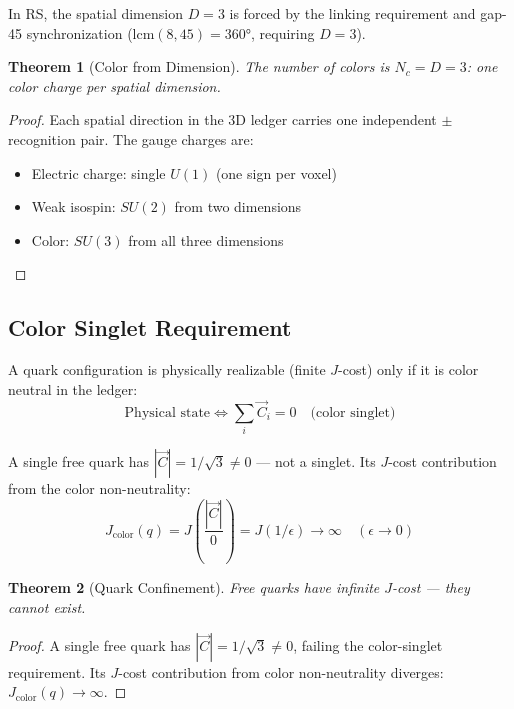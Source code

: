 \documentclass[12pt,a4paper]{article}
\newtheorem{theorem}{Theorem}[section]
\theoremstyle{definition}
\theoremstyle{remark}
\begin{document}
In RS, the spatial dimension $D = 3$ is forced by the linking requirement and 
gap-45 synchronization ($\mathrm{lcm}(8, 45) = 360°$, requiring $D = 3$).

\begin{theorem}[Color from Dimension]
The number of colors is $N_c = D = 3$: one color charge per spatial dimension.
\end{theorem}

\begin{proof}
Each spatial direction in the 3D ledger carries one independent
$\pm$ recognition pair. The gauge charges are:
\begin{itemize}
\item Electric charge: single $U(1)$ (one sign per voxel)
\item Weak isospin: $SU(2)$ from two dimensions
\item Color: $SU(3)$ from all three dimensions
\end{itemize}
\end{proof}

\subsection{Color Singlet Requirement}

A quark configuration is physically realizable (finite $J$-cost) only if it is 
color neutral in the ledger:
\begin{equation}
\text{Physical state} \iff \sum_i \vec{C}_i = 0 \quad \text{(color singlet)}
\end{equation}

A single free quark has $|\vec{C}| = 1/\sqrt{3} \neq 0$ — not a singlet.
Its $J$-cost contribution from the color non-neutrality:
\begin{equation}
J_\mathrm{color}(q) = J\!\left(\frac{|\vec{C}|}{0}\right) = J(1/\epsilon) \to \infty \quad (\epsilon \to 0)
\end{equation}

\begin{theorem}[Quark Confinement]
Free quarks have infinite $J$-cost --- they cannot exist.
\end{theorem}

\begin{proof}
A single free quark has $|\vec{C}| = 1/\sqrt{3} \neq 0$, failing the color-singlet requirement. Its $J$-cost contribution from color non-neutrality diverges: $J_\mathrm{color}(q) \to \infty$.
\end{proof}
\end{document}
